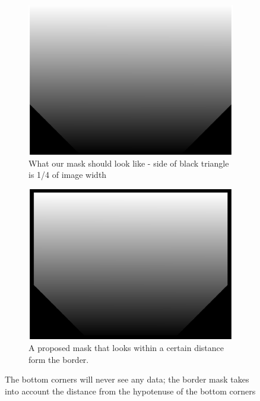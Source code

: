 \documentclass[10pt]{scrartcl}
\begin{document}
\begin{figure}[!ht]
    \centering
    \hspace{-1.0in}
    \begin{subfigure}[b]{.45\linewidth}
        \centering
        \includegraphics[width=1.3\textwidth]{../plots_tables_images/cutcorner.eps}
        \caption{What our mask should look like - side of black triangle is 1/4 of image width}
        \label{noborder}
    \end{subfigure}
    \hspace{.5in}
    \begin{subfigure}[b]{.45\linewidth}
        \centering
        \includegraphics[width=1.3\textwidth]{../plots_tables_images/cutcornerwborder.eps}
        \caption{A proposed mask that looks within a certain distance form the border.}
        \label{aborder}
    \end{subfigure}
    \caption{The bottom corners will never see any data; the border mask takes into account the distance from the hypotenuse of the bottom corners}
    \label{cuttingcorners}
\end{figure}
\end{document}
